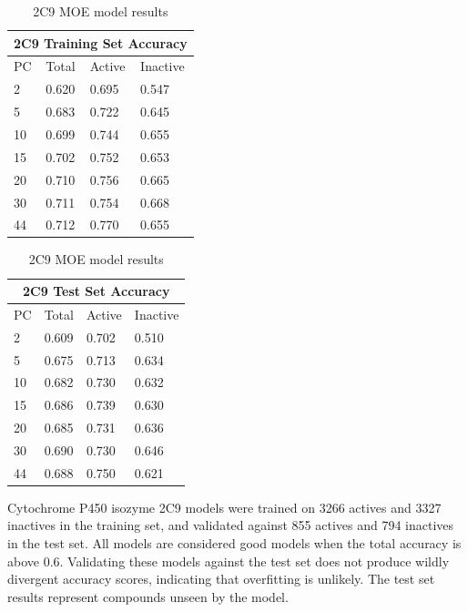 \begin{table}[!htbp]
\begin{minipage}{.5\linewidth}
\centering
\begin{tabular}{|l|l|l|l|}
\hline
\multicolumn{4}{|c|}{2C9 Training Set Accuracy} \\ \hline
PC & Total          & Active          & Inactive\\ \hline
2  & 0.620          & 0.695           & 0.547   \\ \hline
5  & 0.683          & 0.722           & 0.645   \\ \hline
10 & 0.699          & 0.744           & 0.655   \\ \hline
15 & 0.702          & 0.752           & 0.653   \\ \hline
20 & 0.710          & 0.756           & 0.665   \\ \hline
30 & 0.711          & 0.754           & 0.668   \\ \hline
44 & 0.712          & 0.770           & 0.655   \\ \hline
\end{tabular}
\end{minipage}
\begin{minipage}{.5\linewidth}
\centering
\begin{tabular}{|l|l|l|l|}
\hline
\multicolumn{4}{|c|}{2C9 Test Set Accuracy}     \\ \hline
PC & Total          & Active          & Inactive\\ \hline
2  & 0.609          & 0.702           & 0.510   \\ \hline
5  & 0.675          & 0.713           & 0.634   \\ \hline
10 & 0.682          & 0.730           & 0.632   \\ \hline
15 & 0.686          & 0.739           & 0.630   \\ \hline
20 & 0.685          & 0.731           & 0.636   \\ \hline
30 & 0.690          & 0.730           & 0.646   \\ \hline
44 & 0.688          & 0.750           & 0.621   \\ \hline
\end{tabular}
\end{minipage}
\caption{2C9 MOE model results}
\end{table}

Cytochrome P450 isozyme 2C9 models were trained on 3266 actives and 3327 inactives in the training set, and validated against 855 actives and 794 inactives in the test set. All models are considered good models when the total accuracy is above 0.6. Validating these models against the test set does not produce wildly divergent accuracy scores, indicating that overfitting is unlikely. The test set results represent compounds unseen by the model. 

